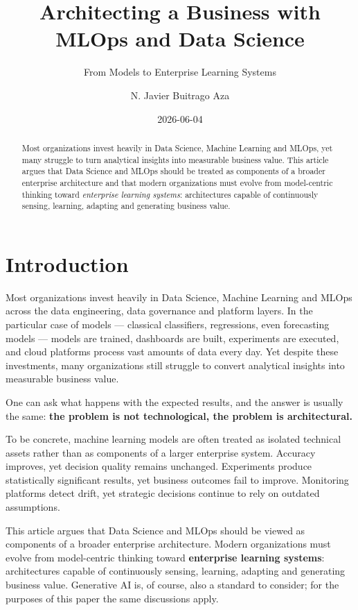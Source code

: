 \documentclass[
  a4paper,
  DIV=11,
  numbers=noendperiod]{scrartcl}
\title{Architecting a Business with MLOps and Data Science}
\subtitle{From Models to Enterprise Learning Systems}
\author{N. Javier Buitrago Aza}
\date{2026-06-04}
\renewcommand*\contentsname{Table of contents}
\newcommand\contentsname{Table of contents}
\begin{document}
\maketitle
\begin{abstract}
Most organizations invest heavily in Data Science, Machine Learning and
MLOps, yet many struggle to turn analytical insights into measurable
business value. This article argues that Data Science and MLOps should
be treated as components of a broader enterprise architecture and that
modern organizations must evolve from model-centric thinking toward
\emph{enterprise learning systems}: architectures capable of
continuously sensing, learning, adapting and generating business value.
\end{abstract}

\renewcommand*\contentsname{Table of contents}
{
\setcounter{tocdepth}{3}
\tableofcontents
}

\section{Introduction}\label{introduction}

Most organizations invest heavily in Data Science, Machine Learning and
MLOps across the data engineering, data governance and platform layers.
In the particular case of models --- classical classifiers, regressions,
even forecasting models --- models are trained, dashboards are built,
experiments are executed, and cloud platforms process vast amounts of
data every day. Yet despite these investments, many organizations still
struggle to convert analytical insights into measurable business value.

One can ask what happens with the expected results, and the answer is
usually the same: \textbf{the problem is not technological, the problem
is architectural.}

To be concrete, machine learning models are often treated as isolated
technical assets rather than as components of a larger enterprise
system. Accuracy improves, yet decision quality remains unchanged.
Experiments produce statistically significant results, yet business
outcomes fail to improve. Monitoring platforms detect drift, yet
strategic decisions continue to rely on outdated assumptions.

This article argues that Data Science and MLOps should be viewed as
components of a broader enterprise architecture. Modern organizations
must evolve from model-centric thinking toward \textbf{enterprise
learning systems}: architectures capable of continuously sensing,
learning, adapting and generating business value. Generative AI is, of
course, also a standard to consider; for the purposes of this paper the
same discussions apply.
\end{document}
